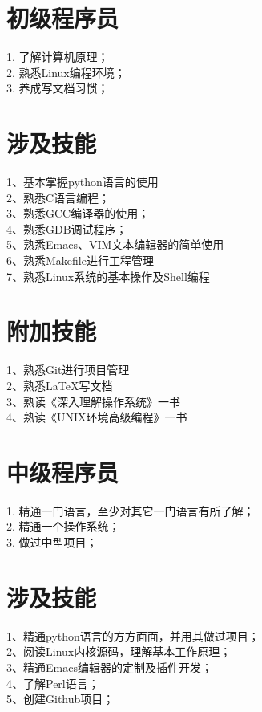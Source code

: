 \documentclass[11pt,a4paper]{book}
\begin{document}
\begin{CJK*}{UTF8}{nsung}
\section{初级程序员}

    1. 了解计算机原理；\\
    2. 熟悉Linux编程环境；\\
    3. 养成写文档习惯；\\

\section{涉及技能}

    1、基本掌握python语言的使用\\
    2、熟悉C语言编程；\\
    3、熟悉GCC编译器的使用；\\
    4、熟悉GDB调试程序；\\
    5、熟悉Emacs、VIM文本编辑器的简单使用\\
    6、熟悉Makefile进行工程管理\\
    7、熟悉Linux系统的基本操作及Shell编程\\

\section{附加技能}
    1、熟悉Git进行项目管理\\
    2、熟悉LaTeX写文档\\
    3、熟读《深入理解操作系统》一书\\
    4、熟读《UNIX环境高级编程》一书\\

    
\section{中级程序员}
    1. 精通一门语言，至少对其它一门语言有所了解；\\
    2. 精通一个操作系统；\\
    3. 做过中型项目；\\

\section{涉及技能}
    1、精通python语言的方方面面，并用其做过项目；\\
    2、阅读Linux内核源码，理解基本工作原理；\\
    3、精通Emacs编辑器的定制及插件开发；\\
    4、了解Perl语言；\\
    5、创建Github项目；\\



\end{CJK*}
\end{document}
